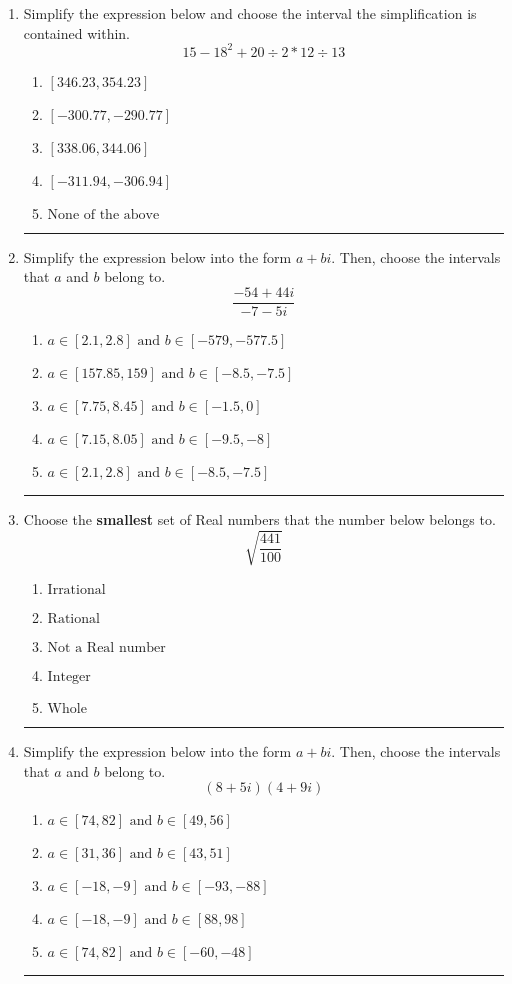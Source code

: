 \documentclass[14pt]{extbook}
\newcommand{\litem}[1]{\item#1\hspace*{-1cm}\rule{\textwidth}{0.4pt}}
\begin{document}
\begin{enumerate}
{\begin{enumerate}[label=\Alph*.]
\end{enumerate} }
\litem{
Simplify the expression below and choose the interval the simplification is contained within.\[ 15 - 18^2 + 20 \div 2 * 12 \div 13 \]\begin{enumerate}[label=\Alph*.]
\item \( [346.23, 354.23] \)
\item \( [-300.77, -290.77] \)
\item \( [338.06, 344.06] \)
\item \( [-311.94, -306.94] \)
\item \( \text{None of the above} \)

\end{enumerate} }
\litem{
Simplify the expression below into the form $a+bi$. Then, choose the intervals that $a$ and $b$ belong to.\[ \frac{-54 + 44 i}{-7 - 5 i} \]\begin{enumerate}[label=\Alph*.]
\item \( a \in [2.1, 2.8] \text{ and } b \in [-579, -577.5] \)
\item \( a \in [157.85, 159] \text{ and } b \in [-8.5, -7.5] \)
\item \( a \in [7.75, 8.45] \text{ and } b \in [-1.5, 0] \)
\item \( a \in [7.15, 8.05] \text{ and } b \in [-9.5, -8] \)
\item \( a \in [2.1, 2.8] \text{ and } b \in [-8.5, -7.5] \)

\end{enumerate} }
\litem{
Choose the \textbf{smallest} set of Real numbers that the number below belongs to.\[ \sqrt{\frac{441}{100}} \]\begin{enumerate}[label=\Alph*.]
\item \( \text{Irrational} \)
\item \( \text{Rational} \)
\item \( \text{Not a Real number} \)
\item \( \text{Integer} \)
\item \( \text{Whole} \)

\end{enumerate} }
\litem{
Simplify the expression below into the form $a+bi$. Then, choose the intervals that $a$ and $b$ belong to.\[ (8 + 5 i)(4 + 9 i) \]\begin{enumerate}[label=\Alph*.]
\item \( a \in [74, 82] \text{ and } b \in [49, 56] \)
\item \( a \in [31, 36] \text{ and } b \in [43, 51] \)
\item \( a \in [-18, -9] \text{ and } b \in [-93, -88] \)
\item \( a \in [-18, -9] \text{ and } b \in [88, 98] \)
\item \( a \in [74, 82] \text{ and } b \in [-60, -48] \)


\end{enumerate}}
\end{enumerate}
\end{document}
